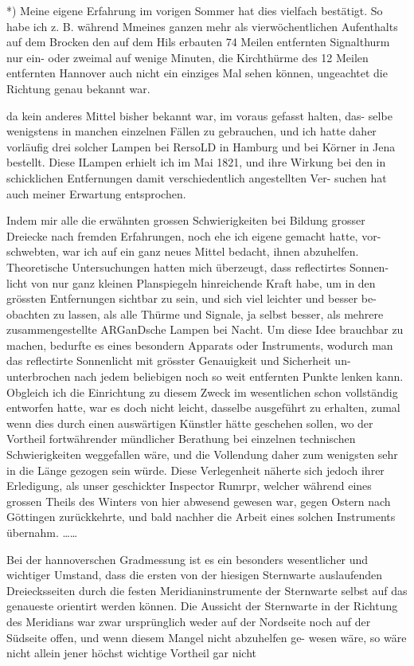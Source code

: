 \documentclass[12pt,a4paper]{article}
\theoremstyle{plain}
\theoremstyle{definition}
\theoremstyle{remark}
\begin{document}
\noindent
*) Meine eigene Erfahrung im vorigen Sommer hat dies vielfach bestätigt. So habe ich z. B. während
Mmeines ganzen mehr als vierwöchentlichen Aufenthalts auf dem Brocken den auf dem Hils erbauten 74
Meilen entfernten Signalthurm nur ein- oder zweimal auf wenige Minuten, die Kirchthürme des 12 Meilen
entfernten Hannover auch nicht ein einziges Mal sehen können, ungeachtet die Richtung genau bekannt war.

\noindent

\noindent
da kein anderes Mittel bisher bekannt war, im voraus gefasst halten, das-
selbe wenigstens in manchen einzelnen Fällen zu gebrauchen, und ich hatte
daher vorläufig drei solcher Lampen bei RersoLD in Hamburg und bei Körner
in Jena bestellt. Diese ILampen erhielt ich im Mai 1821, und ihre Wirkung
bei den in schicklichen Entfernungen damit verschiedentlich angestellten Ver-
suchen hat auch meiner Erwartung entsprochen.

\noindent
Indem mir alle die erwähnten grossen Schwierigkeiten bei Bildung grosser
Dreiecke nach fremden Erfahrungen, noch ehe ich eigene gemacht hatte, vor-
schwebten, war ich auf ein ganz neues Mittel bedacht, ihnen abzuhelfen.
Theoretische Untersuchungen hatten mich überzeugt, dass reflectirtes Sonnen-
licht von nur ganz kleinen Planspiegeln hinreichende Kraft habe, um in den
grössten Entfernungen sichtbar zu sein, und sich viel leichter und besser be-
obachten zu lassen, als alle Thürme und Signale, ja selbst besser, als mehrere
zusammengestellte ARGanDsche Lampen bei Nacht. Um diese Idee brauchbar
zu machen, bedurfte es eines besondern Apparats oder Instruments, wodurch
man das reflectirte Sonnenlicht mit grösster Genauigkeit und Sicherheit un-
unterbrochen nach jedem beliebigen noch so weit entfernten Punkte lenken
kann. Obgleich ich die Einrichtung zu diesem Zweck im wesentlichen schon
vollständig entworfen hatte, war es doch nicht leicht, dasselbe ausgeführt zu
erhalten, zumal wenn dies durch einen auswärtigen Künstler hätte geschehen
sollen, wo der Vortheil fortwährender mündlicher Berathung bei einzelnen
technischen Schwierigkeiten weggefallen wäre, und die Vollendung daher zum
wenigsten sehr in die Länge gezogen sein würde. Diese Verlegenheit näherte
sich jedoch ihrer Erledigung, als unser geschickter Inspector Rumrpr, welcher
während eines grossen Theils des Winters von hier abwesend gewesen war,
gegen Ostern nach Göttingen zurückkehrte, und bald nachher die Arbeit eines
solchen Instruments übernahm. \ldots\ldots

\noindent
Bei der hannoverschen Gradmessung ist es ein besonders wesentlicher und
wichtiger Umstand, dass die ersten von der hiesigen Sternwarte auslaufenden
Dreiecksseiten durch die festen Meridianinstrumente der Sternwarte selbst
auf das genaueste orientirt werden können. Die Aussicht der Sternwarte in
der Richtung des Meridians war zwar ursprünglich weder auf der Nordseite
noch auf der Südseite offen, und wenn diesem Mangel nicht abzuhelfen ge-
wesen wäre, so wäre nicht allein jener höchst wichtige Vortheil gar nicht
\end{document}

